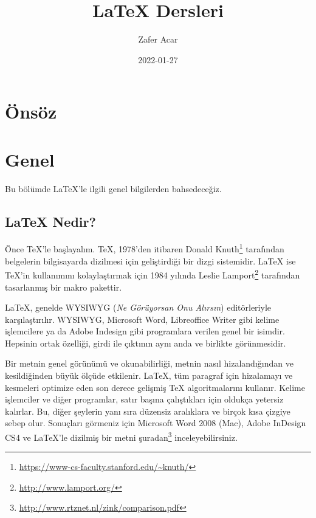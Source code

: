 \documentclass[
  10pt,
]{scrbook}
\title{LaTeX Dersleri}
\author{Zafer Acar}
\date{2022-01-27}
\renewcommand{\href}[2]{#2\footnote{\url{#1}}}
\theoremstyle{definition}
\theoremstyle{definition}
\theoremstyle{definition}
\theoremstyle{definition}
\theoremstyle{remark}
\begin{document}
\maketitle

\newcommand{\insvg}{\begingroup%
\renewcommand{\includegraphics}{}%
\noindent\rule{\textwidth}{1pt}%
}%
\newcommand{\outsvg}{%
\\\noindent\rule{\textwidth}{1pt}%
\endgroup%
}%

{
\setcounter{tocdepth}{2}
\tableofcontents
}
\listoffigures
\listoftables
\hypertarget{uxf6nsuxf6z}{%
\chapter*{Önsöz}\label{uxf6nsuxf6z}}

\mainmatter

\hypertarget{genel}{%
\chapter{Genel}\label{genel}}

Bu bölümde LaTeX'le ilgili genel bilgilerden bahsedeceğiz.

\hypertarget{latex-nedir}{%
\section{LaTeX Nedir?}\label{latex-nedir}}

Önce TeX'le başlayalım. TeX, 1978'den itibaren \href{https://www-cs-faculty.stanford.edu/~knuth/}{Donald Knuth} tarafından belgelerin bilgisayarda dizilmesi için geliştirdiği bir dizgi sistemidir. LaTeX ise TeX'in kullanımını kolaylaştırmak için 1984 yılında \href{http://www.lamport.org/}{Leslie Lamport} tarafından tasarlanmış bir makro pakettir.

LaTeX, genelde WYSIWYG (\emph{Ne Görüyorsan Onu Alırsın}) editörleriyle karşılaştırılır. WYSIWYG, Microsoft Word, Libreoffice Writer gibi kelime işlemcilere ya da Adobe Indesign gibi programlara verilen genel bir isimdir. Hepsinin ortak özelliği, girdi ile çıktının aynı anda ve birlikte görünmesidir.

Bir metnin genel görünümü ve okunabilirliği, metnin nasıl hizalandığından ve kesildiğinden büyük ölçüde etkilenir. LaTeX, tüm paragraf için hizalamayı ve kesmeleri optimize eden son derece gelişmiş TeX algoritmalarını kullanır. Kelime işlemciler ve diğer programlar, satır başına çalıştıkları için oldukça yetersiz kalırlar. Bu, diğer şeylerin yanı sıra düzensiz aralıklara ve birçok kısa çizgiye sebep olur. Sonuçları görmeniz için Microsoft Word 2008 (Mac), Adobe InDesign CS4 ve LaTeX'le dizilmiş bir metni \href{http://www.rtznet.nl/zink/comparison.pdf}{şuradan} inceleyebilirsiniz.
\end{document}
